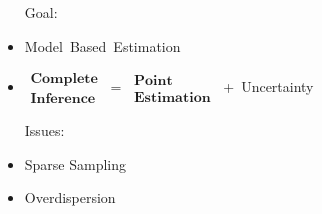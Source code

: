 \documentclass[ xcolor = pdftex, dvipsnames, table ]{beamer}
\begin{document}
\begin{frame}
{%
%
\begin{minipage}{0.6\textwidth}
\begin{itemize}
	\setlength\itemsep{0.25cm}
	\item[Goal:]$~$\\
	\item \mbox{Model Based Estimation}
	\item \mbox{$\mathbf{\substack{\text{Complete}\\\text{Inference}}}$ = $\mathbf{\substack{\text{Point}\\\text{Estimation}}}$ + Uncertainty}
\end{itemize}
\begin{itemize}
	\setlength\itemsep{0.25cm}
	\item[Issues:]$~$\\	
	\item Sparse Sampling\\%
	\item Overdispersion
\end{itemize}
\end{minipage}
}
\end{frame}
\end{document}
